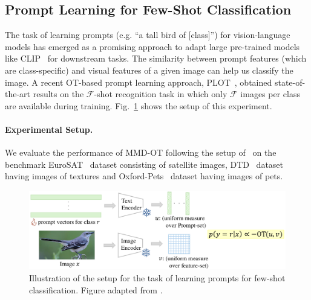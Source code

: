 \subsection{Prompt Learning for Few-Shot Classification}\label{exp:prompt-uot}
The task of learning prompts (e.g. ``a tall bird of [class]'') for vision-language models has emerged as a promising approach to adapt large pre-trained models like CLIP~\citep{clip} for downstream tasks. The similarity between prompt features (which are class-specific) and visual features of a given image can help us classify the image. A recent OT-based prompt learning approach, PLOT~\citep{chen2023plot}, obtained state-of-the-art results on the $\mathcal{F}$-shot recognition task in which only $\mathcal{F}$ images per class are available during training. Fig.~\ref{fig:prompt-illus} shows the setup of this experiment.
\paragraph{Experimental Setup.}
We evaluate the performance of MMD-OT following the setup of~\cite{chen2023plot} on the benchmark EuroSAT~\citep{helber2019eurosat} dataset consisting of satellite images, DTD~\citep{dtd} dataset having images of textures and Oxford-Pets~\citep{oxp} dataset having images of pets. 
\begin{figure}[t]
    \centering
    \includegraphics[width=\linewidth]{chapter-1/images/prompt-illustr.pdf}
    \caption[Illustration of the setup for the task of learning prompts for few-shot classification.]{Illustration of the setup for the task of learning prompts for few-shot classification. Figure adapted from \cite{chen2023plot}.}
    \label{fig:prompt-illus}
\end{figure}


